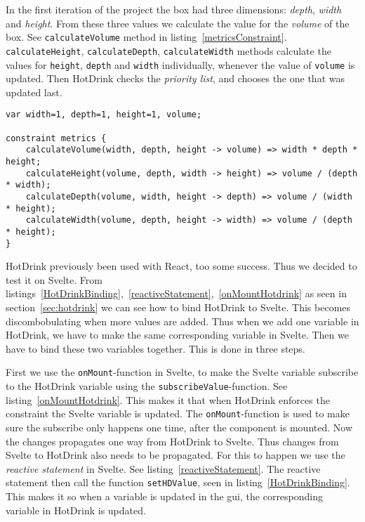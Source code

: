 In the first iteration of the project the box had three dimensions: \textit{depth}, 
\textit{width} and \textit{height}. From these three values we calculate the value 
for the \textit{volume} of the box. See \texttt{calculateVolume} method in 
listing~\ref{metricsConstraint}. \texttt{calculateHeight}, \texttt{calculateDepth}, 
\texttt{calculateWidth} methods calculate the values for \texttt{height}, 
\texttt{depth} and \texttt{width} individually, whenever the value of \texttt{volume} 
is updated. Then HotDrink checks the \textit{priority list}, and chooses the one that 
was updated last.

\begin{lstlisting}[caption={Example of the constraint calculating the values of the box},label=metricsConstraint, language=hotdrink]
var width=1, depth=1, height=1, volume;

constraint metrics {
    calculateVolume(width, depth, height -> volume) => width * depth * height;
    calculateHeight(volume, depth, width -> height) => volume / (depth * width);
    calculateDepth(volume, width, height -> depth) => volume / (width * height);
    calculateWidth(volume, depth, height -> width) => volume / (depth * height);
}
\end{lstlisting}

HotDrink previously been used with React, too some success. Thus we decided to test it 
on Svelte. 
From listings~\ref{HotDrinkBinding},~\ref{reactiveStatement},~\ref{onMountHotdrink} 
as seen in section~\ref{sec:hotdrink} we can see how to bind HotDrink to Svelte. This 
becomes discombobulating when more values are added. Thus when we add one variable in 
HotDrink, we have to make the same corresponding variable in Svelte. Then we have to 
bind these two variables together. This is done in three steps. 

First we use the 
\texttt{onMount}-function in Svelte, to make the Svelte variable subscribe to the HotDrink 
variable using the \texttt{subscribeValue}-function. See listing~\ref{onMountHotdrink}. 
This makes it that when HotDrink enforces the constraint the Svelte variable is updated. 
The \texttt{onMount}-function is used to make sure the subscribe only happens one time, 
after the component is mounted. Now the changes propagates one way from HotDrink to Svelte. 
Thus changes from Svelte to HotDrink also needs to be propagated. For this to happen we 
use the \textit{reactive statement} in Svelte. See listing~\ref{reactiveStatement}. The 
reactive statement then call the function \texttt{setHDValue}, seen in 
listing~\ref{HotDrinkBinding}. This makes it so when a variable is updated in the \gls{gui}, 
the corresponding variable in HotDrink is updated.
